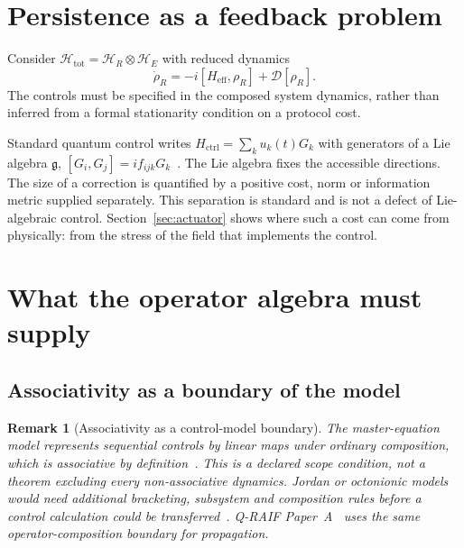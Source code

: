\documentclass[aps,pre,onecolumn,superscriptaddress,floatfix,longbibliography]{revtex4-2}
\newtheorem{remark}[theorem]{Remark}
\begin{document}
\section{Persistence as a feedback problem}
\label{sec:persistence}

Consider $\mathcal{H}_{\mathrm{tot}} = \mathcal{H}_R \otimes \mathcal{H}_E$ with reduced dynamics
\begin{equation}
\dot{\rho}_R = -i[H_{\mathrm{eff}}, \rho_R] + \mathcal{D}[\rho_R].
\end{equation}
The controls must be specified in the composed system dynamics, rather than inferred from a formal stationarity condition on a protocol cost.

Standard quantum control writes $H_{\mathrm{ctrl}} = \sum_k u_k(t) G_k$ with generators of a Lie algebra $\mathfrak g$, $[G_i, G_j] = i f_{ijk} G_k$~\cite{WisemanMilburn2009}. The Lie algebra fixes the accessible directions. The size of a correction is quantified by a positive cost, norm or information metric supplied separately. This separation is standard and is not a defect of Lie-algebraic control. Section~\ref{sec:actuator} shows where such a cost can come from physically: from the stress of the field that implements the control.

\section{What the operator algebra must supply}
\label{sec:algebra}

\subsection{Associativity as a boundary of the model}
\label{sec:assoc}

\begin{remark}[Associativity as a control-model boundary]
\label{rem:assoc-boundary}
The master-equation model represents sequential controls by linear maps under ordinary composition, which is associative by definition~\cite{Breuer2002}. This is a declared scope condition, not a theorem excluding every non-associative dynamics. Jordan or octonionic models would need additional bracketing, subsystem and composition rules before a control calculation could be transferred~\cite{Schafer1966,Gunaydin1973}. Q-RAIF Paper~A~\cite{Liu2026QRAIF_A} uses the same operator-composition boundary for propagation.
\end{remark}
\end{document}
